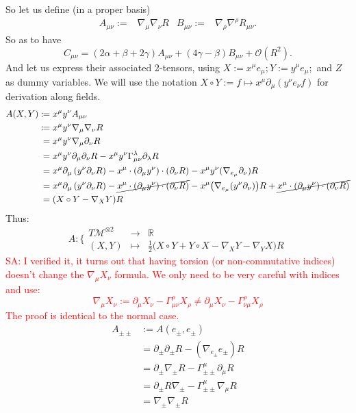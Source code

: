 \documentclass[a4paper,11pt]{article}
\numberwithin{equation}{section}
\theoremstyle{definition}
\newcommand{\SA}[1]{\textcolor{red}{SA: #1}}
\begin{document}
\noindent So let us define (in a proper basis)
\begin{align}
    A_{\mu\nu} :=& \nabla_\mu\nabla_\nu R&
    B_{\mu\nu} :=& \nabla_\rho\nabla^\rho R_{\mu\nu}.
\end{align}
So as to have 
\begin{equation}
    C_{\mu\nu} = (2\alpha + \beta + 2\gamma) A_{\mu\nu} +(4\gamma- \beta) B_{\mu\nu} + \mathcal{O}(R^2).
\end{equation}
And let us express their associated 2-tensors, using $X:=x^\mu e_\mu; Y:=y^\mu e_\mu;$ and $Z$ as dummy variables. We will use the notation $X\circ Y:= f \mapsto x^\mu \partial_\mu (y^\nu e_\nu f)$ for derivation along fields.
\begin{align}
    A(X,Y) :\!\!&= x^\mu y^\nu A_{\mu\nu}\notag\\
    :\!\!&= x^\mu y^\nu \nabla_\mu \nabla_\nu R\notag\\
    &= x^\mu y^\nu \nabla_\mu \partial_\nu R\notag\\
    &= x^\mu y^\nu \partial_\mu \partial_\nu R - x^\mu y^\nu \Gamma_{\mu\nu}^\lambda \partial_\lambda R\notag\\
    &= x^\mu \partial_\mu \left(y^\nu \partial_\nu R \right) - x^\mu \cdot(\partial_\mu y^\nu) \cdot (\partial_\nu R) - x^\mu y^\nu (\nabla_{e_\mu} \partial_\nu)R\notag\\
    &= x^\mu \partial_\mu \left(y^\nu \partial_\nu R \right) - \cancel{x^\mu \cdot(\partial_\mu y^\nu) \cdot (\partial_\nu R)} - x^\mu \big(\nabla_{e_\mu} (y^\nu \partial_\nu)\big)R + \cancel{x^\mu \cdot (\partial_\mu y^\nu) \cdot (\partial_\nu R)}\notag\\
    &= (X\circ Y - \nabla_X Y) R
\end{align}
Thus:
\begin{equation}
    A : \Bigg\{\begin{matrix}
        T\mathcal{M}^{\otimes 2} & \to & \mathbb{R}\\
        (X,Y) & \mapsto & \frac{1}{2}\big(X\circ Y + Y\circ X - \nabla_X Y - \nabla_Y X\big) R
    \end{matrix}
\end{equation}
\SA{I verified it, it turns out that having torsion (or non-commutative indices) doesn't change the $\nabla_\mu X_\nu$ formula. We only need to be very careful with indices and use:
$$\nabla_\mu X_\nu := \partial_\mu X_\nu - \Gamma_{\mu\nu}^\rho X_\rho \ne \partial_\mu X_\nu - \Gamma_{\nu\mu}^\rho X_\rho$$
The proof is identical to the normal case.}
\begin{align*}
    A_{\pm\pm} &\!\!:= A(e_\pm,e_\pm)
    \\&= \partial_\pm \partial_\pm R - (\nabla_{e_\pm}e_\pm) R\\
    &= \partial_\pm \nabla_\pm R- \Gamma_{\pm\pm}^\mu \partial_\mu R\\
    &= \partial_\pm R \nabla_\pm- \Gamma_{\pm\pm}^\mu \nabla_\mu R\\
    &= \nabla_\pm \nabla_\pm R
\end{align*}
\end{document}
